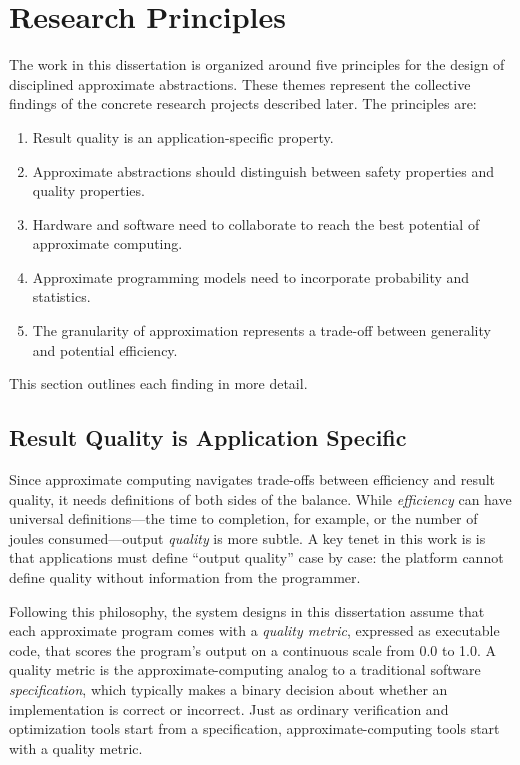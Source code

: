 \section{Research Principles}

The work in this dissertation is organized around five principles
for the design of disciplined approximate abstractions.
These themes represent the collective findings of the concrete research
projects described later.
The principles are:
%
\begin{enumerate}
\item Result quality is an application-specific property.
\item Approximate abstractions should distinguish between safety properties
    and quality properties.
\item Hardware and software need to collaborate to reach the best
    potential of approximate computing.
\item Approximate programming models need to incorporate probability and
    statistics.
\item The granularity of approximation represents a trade-off between
    generality and potential efficiency.
\end{enumerate}
%
This section outlines each finding in more detail.

\subsection{Result Quality is Application Specific}
\label{sec:princ:appspecific}

Since approximate computing navigates trade-offs between efficiency and result
quality, it needs definitions of both sides of the balance.
While \emph{efficiency} can have universal definitions---the time to
completion, for example, or the number of joules consumed---output
\emph{quality} is more subtle.
A key tenet in this work is is that applications must define ``output
quality'' case by case:
the platform cannot define quality without information from the programmer.

Following this philosophy, the system designs in this dissertation assume that
each approximate program comes with a \emph{quality metric}, expressed as
executable code, that scores the program's output on a continuous scale from
0.0 to 1.0.
A quality metric is the approximate-computing analog to a traditional software
\emph{specification}, which typically makes a binary decision about whether an
implementation is correct or incorrect.
Just as ordinary verification and optimization tools start from a
specification, approximate-computing tools start with a quality metric.

